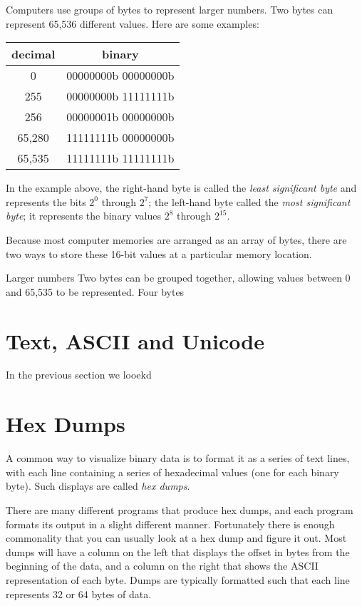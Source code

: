 \documentclass[11pt,letter]{book}
\begin{document}
Computers use groups of bytes to represent larger numbers. Two bytes
can represent 65,536 different values. Here are some examples:

\begin{tabular}{cc}
decimal & binary \\
\hline
0      & 00000000b 00000000b \\
255    & 00000000b 11111111b \\
256    & 00000001b 00000000b \\
65,280 & 11111111b 00000000b \\
65,535 & 11111111b 11111111b \\
\hline
\end{tabular}

In the example above, the right-hand byte is called the \emph{least
  significant byte} and represents the bits $2^0$ through $2^7$; the
left-hand byte  called the \emph{most
significant byte}; it represents the binary values $2^8$ through
$2^{15}$. 


Because most computer memories are arranged as an array of bytes,
there are two ways to store these 16-bit values at a particular memory
location. 



Larger numbers Two bytes can be grouped together, allowing values between 0 and
65,535 to be represented. Four bytes

\section{Text, ASCII and Unicode}\label{sec:letters}

In the previous section we looekd 

\section{Hex Dumps}\label{sec:hex-dumps}
A common way to visualize binary data is to format it as a series of
text lines, with each line containing a series of hexadecimal values (one
for each binary byte). Such displays are called \emph{hex
  dumps}.

There are many different programs that produce hex dumps, and each
program formats its output in a slight different manner. Fortunately
there is enough commonality that you can usually look at a hex dump
and figure it out. Most dumps will have a column on the left that
displays the offset in bytes from the beginning of the data, and a
column on the right that shows the ASCII representation of each
byte. Dumps are typically formatted such that each line represents 32
or 64 bytes of data.
\end{document}
